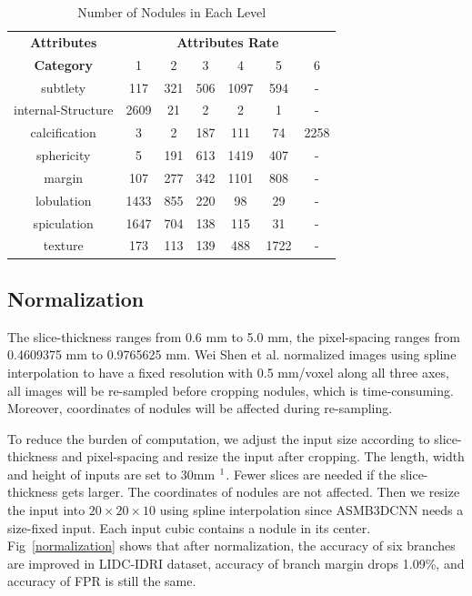 \documentclass[runningheads]{llncs}
\begin{document}
\begin{table}[htb]
\caption{Number of  Nodules in Each Level}
\begin{center}
\begin{tabular}{|c|c|c|c|c|c|c|}
\hline
\textbf{Attributes}&\multicolumn{6}{|c|}{\textbf{Attributes Rate}} \\
\cline{2-7}
\textbf{Category}& 1&2&3&4&5&6\\
\hline
subtlety&117&321&506&1097&594&-\\
internal-Structure&2609&21&2&2&1&-\\
calcification&3&2&187&111&74&2258\\
sphericity&5&191&613&1419&407& -\\
margin& 107&277&342&1101&808& - \\
lobulation&1433&855&220&98&29& - \\
spiculation&1647&704&138&115&31& - \\
texture&173&113&139&488&1722& - \\
\hline
\end{tabular}
\vspace{-0.5cm}
\label{tab3}
\end{center}

\end{table}


\subsection{Normalization}
The slice-thickness ranges from 0.6 mm to 5.0 mm, the pixel-spacing ranges from 0.4609375 mm to 0.9765625 mm. Wei Shen et al. \cite{Shen2017Multi} normalized images using spline interpolation to have a fixed resolution with 0.5 mm/voxel along all three axes, all images will be re-sampled before cropping nodules, which is time-consuming. Moreover, coordinates of nodules will be affected during re-sampling.

To reduce the burden of computation, we adjust the input size according to slice-thickness and pixel-spacing and resize the input after cropping. The length, width and height of inputs are set to 30mm  $\footnote[1]{In clinical, nodules larger than 30mm in diameter are called lung masses and will not be discussed here}$. 
Fewer slices are needed if the slice-thickness gets larger.
The coordinates of nodules are not affected.
Then we resize the input into $20\times20\times10$ using spline interpolation since ASMB3DCNN needs a size-fixed input. Each input cubic contains a nodule in its center.
Fig~\ref{normalization} shows that after normalization, the accuracy of six branches are improved in LIDC-IDRI dataset, accuracy of branch margin drops 1.09\%, and accuracy of FPR is still the same.
\end{document}
